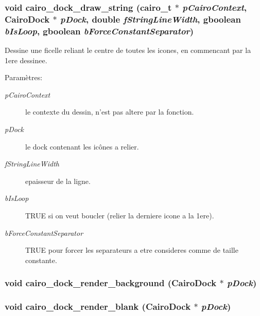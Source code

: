 \subsubsection{\setlength{\rightskip}{0pt plus 5cm}void cairo\_\-dock\_\-draw\_\-string (cairo\_\-t $\ast$ {\em pCairoContext}, {\bf CairoDock} $\ast$ {\em pDock}, double {\em fStringLineWidth}, gboolean {\em bIsLoop}, gboolean {\em bForceConstantSeparator})}\label{cairo-dock-draw_8h_2b8ce54b5b1ce5b64cba73aa8f2431b6}


Dessine une ficelle reliant le centre de toutes les icones, en commencant par la 1ere dessinee. \begin{Desc}
\item[Paramètres:]
\begin{description}
\item[{\em pCairoContext}]le contexte du dessin, n'est pas altere par la fonction. \item[{\em pDock}]le dock contenant les icônes a relier. \item[{\em fStringLineWidth}]epaisseur de la ligne. \item[{\em bIsLoop}]TRUE si on veut boucler (relier la derniere icone a la 1ere). \item[{\em bForceConstantSeparator}]TRUE pour forcer les separateurs a etre consideres comme de taille constante. \end{description}
\end{Desc}
\subsubsection{\setlength{\rightskip}{0pt plus 5cm}void cairo\_\-dock\_\-render\_\-background ({\bf CairoDock} $\ast$ {\em pDock})}\label{cairo-dock-draw_8h_cbf4ddecfb07100464b88c9188351346}


\subsubsection{\setlength{\rightskip}{0pt plus 5cm}void cairo\_\-dock\_\-render\_\-blank ({\bf CairoDock} $\ast$ {\em pDock})}\label{cairo-dock-draw_8h_0082ff87537c9b2dcdfc76eb3a51c76f}


